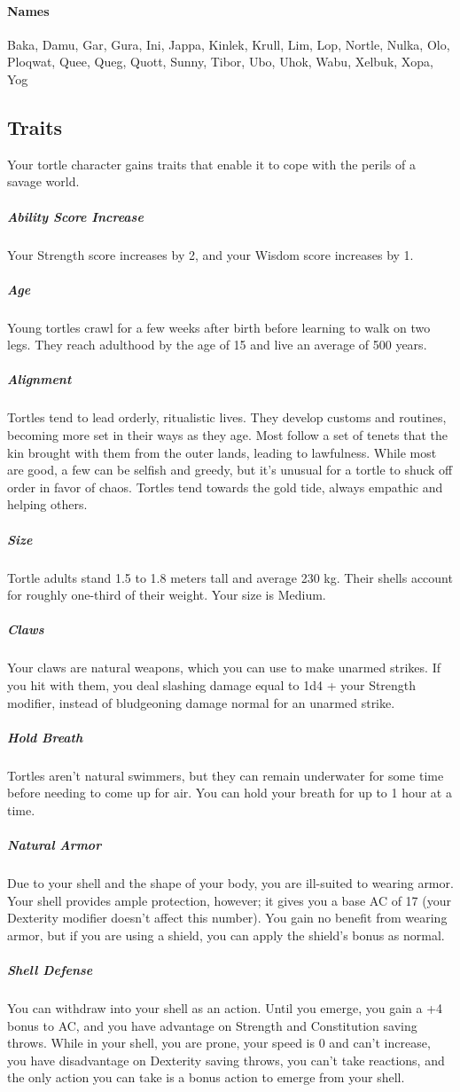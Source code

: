 \begin{linenumbers}
\paragraph{Names}
Baka, Damu, Gar, Gura, Ini, Jappa, Kinlek, Krull, Lim, Lop, Nortle, Nulka, Olo, Ploqwat, Quee, Queg, Quott, Sunny, Tibor, Ubo, Uhok, Wabu, Xelbuk, Xopa, Yog

\subsection*{Traits}
Your tortle character gains traits that enable it to cope with the perils of a savage world.
\subparagraph{Ability Score Increase} Your Strength score increases by 2, and your Wisdom score increases by 1.
\subparagraph{Age} Young tortles crawl for a few weeks after birth before learning to walk on two legs. 
They reach adulthood by the age of 15 and live an average of 500 years.
\subparagraph{Alignment} Tortles tend to lead orderly, ritualistic lives.
They develop customs and routines, becoming more set in their ways as they age.
Most follow a set of tenets that the kin brought with them from the outer lands, leading to lawfulness.
While most are good, a few can be selfish and greedy, but it's unusual for a tortle to shuck off order in favor of chaos.
Tortles tend towards the gold tide, always empathic and helping others.
\subparagraph{Size} Tortle adults stand 1.5 to 1.8 meters tall and average 230 kg.
Their shells account for roughly one-third of their weight.
Your size is Medium.
\subparagraph{Claws} Your claws are natural weapons, which you can use to make unarmed strikes.
If you hit with them, you deal slashing damage equal to 1d4 + your Strength modifier, instead of bludgeoning damage normal for an unarmed strike.
\subparagraph{Hold Breath} Tortles aren't natural swimmers, but they can remain underwater for some time before needing to come up for air.
You can hold your breath for up to 1 hour at a time.
\subparagraph{Natural Armor} Due to your shell and the shape of your body, you are ill-suited to wearing armor.
Your shell provides ample protection, however; it gives you a base AC of 17 (your Dexterity modifier doesn't affect this number).
You gain no benefit from wearing armor, but if you are using a shield, you can apply the shield's bonus as normal.
\subparagraph{Shell Defense} You can withdraw into your shell as an action.
Until you emerge, you gain a +4 bonus to AC, and you have advantage on Strength and Constitution saving throws.
While in your shell, you are prone, your speed is 0 and can't increase, you have disadvantage on Dexterity saving throws, you can't take reactions, and the only action you can take is a bonus action to emerge from your shell.

\end{linenumbers}
